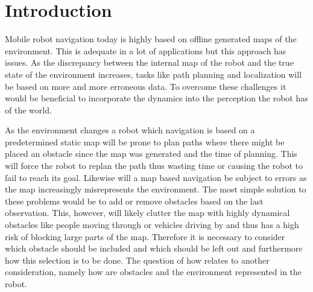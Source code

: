 \chapter{Introduction}

Mobile robot navigation today is highly based on offline generated maps of the environment. This is adequate in a lot of applications but this approach has issues. As the discrepancy between the internal map of the robot and the true state of the environment increases, tasks like path planning and localization will be based on more and more erroneous data. To overcome these challenges it would be beneficial to incorporate the dynamics into the perception the robot has of the world.

As the environment changes a robot which navigation is based on a predetermined static map will be prone to plan paths where there might be placed an obstacle since the map was generated and the time of planning. This will force the robot to replan the path thus wasting time or causing the robot to fail to reach its goal. Likewise will a map based navigation be subject to errors as the map increasingly misrepresents the environment. The most simple solution to these problems would be to add or remove obstacles based on the last observation. This, however, will likely clutter the map with highly dynamical obstacles like people moving through or vehicles driving by and thus has a high risk of blocking large parts of the map. Therefore it is necessary to consider which obstacle should be included and which should be left out and furthermore how this selection is to be done.  The question of how relates to another consideration, namely how are obstacles and the environment represented in the robot.

